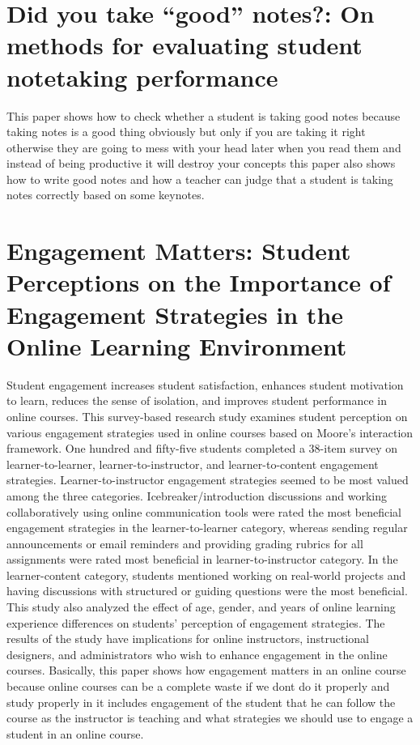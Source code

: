 \documentclass[12pt]{article}
\begin{document}
\section{Did you take “good” notes?: On methods for evaluating student notetaking performance}
This paper shows how to check whether a student is taking good notes because taking notes is a good thing obviously but only if you are taking it right otherwise they are going to mess with your head later when you read them and instead of being productive it will destroy your concepts this paper also shows how to write good notes and how a teacher can judge that a student is taking notes correctly based on some keynotes.

\section{Engagement Matters: Student Perceptions on the Importance of Engagement Strategies in the Online Learning Environment}
Student engagement increases student satisfaction, enhances student motivation to learn, reduces the sense of isolation, and improves student performance in online courses. This survey-based research study examines student perception on various engagement strategies used in online courses based on Moore’s interaction framework. One hundred and fifty-five students completed a 38-item survey on learner-to-learner, learner-to-instructor, and learner-to-content engagement strategies. Learner-to-instructor engagement strategies seemed to be most valued among the three categories. Icebreaker/introduction discussions and working collaboratively using online communication tools were rated the most beneficial engagement strategies in the learner-to-learner category, whereas sending regular announcements or email reminders and providing grading rubrics for all assignments were rated most beneficial in learner-to-instructor category. In the learner-content category, students mentioned working on real-world projects and having discussions with structured or guiding questions were the most beneficial. This study also analyzed the effect of age, gender, and years of online learning experience differences on students’ perception of engagement strategies. The results of the study have implications for online instructors, instructional designers, and administrators who wish to enhance engagement in the online courses.
Basically, this paper shows how engagement matters in an online course because online courses can be a complete waste if we dont do it properly and study properly in it includes engagement of the student that he can follow the course as the instructor is teaching and what strategies we should use to engage a student in an online course. 
\end{document}
